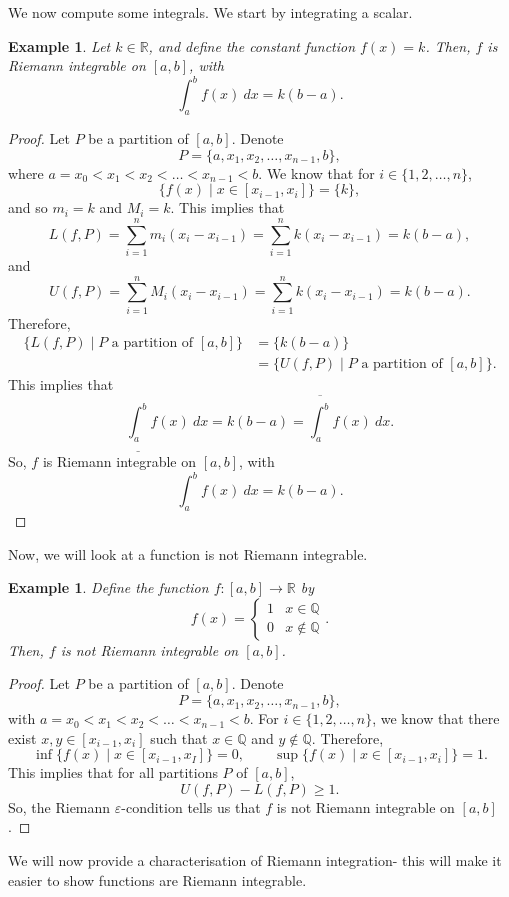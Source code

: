 \documentclass[a4paper, openany]{memoir}
\theoremstyle{definition}
\theoremstyle{plain}
\newtheorem{example}[definition]{Example}
\begin{document}
We now compute some integrals. We start by integrating a scalar.
\begin{example}
Let $k \in \mathbb{R}$, and define the constant function $f(x) = k$. Then, $f$ is Riemann integrable on $[a, b]$, with
\[\int_a^b f(x) \ dx = k(b - a).\]
\end{example}
\begin{proof}
Let $P$ be a partition of $[a, b]$. Denote
\[P = \{a, x_1, x_2, \dots, x_{n-1}, b\},\]
where $a = x_0 < x_1 < x_2 < \dots < x_{n-1} < b$. We know that for $i \in \{1, 2, \dots, n\}$,
\[\{f(x) \mid x \in [x_{i-1}, x_i]\} = \{k\},\]
and so $m_i = k$ and $M_i = k$. This implies that
\[L(f, P) = \sum_{i=1}^n m_i(x_i - x_{i-1}) = \sum_{i=1}^n k(x_i - x_{i-1}) = k(b - a),\]
and
\[U(f, P) = \sum_{i=1}^n M_i(x_i - x_{i-1}) = \sum_{i=1}^n k(x_i - x_{i-1}) = k(b - a).\]
Therefore,
\begin{align*}
    \{L(f, P) \mid P \text{ a partition of } [a, b]\} &= \{k(b - a)\} \\
    &= \{U(f, P) \mid P \text{ a partition of } [a, b]\}.
\end{align*}
This implies that
\[\underline{\int_a^b} f(x) \ dx = k(b - a) = \overline{\int_a^b} f(x) \ dx.\]
So, $f$ is Riemann integrable on $[a, b]$, with
\[\int_a^b f(x) \ dx = k(b - a).\]
\end{proof}
\noindent Now, we will look at a function is not Riemann integrable.
\begin{example}
Define the function $f: [a, b] \to \mathbb{R}$ by
\[f(x) = \begin{cases}
1 & x \in \mathbb{Q} \\
0 & x \not\in \mathbb{Q}
\end{cases}.\]
Then, $f$ is not Riemann integrable on $[a, b]$.
\end{example}
\begin{proof}
Let $P$ be a partition of $[a, b]$. Denote
\[P = \{a, x_1, x_2, \dots, x_{n-1}, b\},\]
with $a = x_0 < x_1 < x_2 < \dots < x_{n-1} < b$. For $i \in \{1, 2, \dots, n\}$, we know that there exist $x, y \in [x_{i-1}, x_i]$ such that $x \in \mathbb{Q}$ and $y \not\in \mathbb{Q}$. Therefore, 
\[\inf \{f(x) \mid x \in [x_{i-1}, x_I]\} = 0, \qquad \sup \{f(x) \mid x \in [x_{i-1}, x_i]\} = 1.\]
This implies that for all partitions $P$ of $[a, b]$,
\[U(f, P) - L(f, P) \geqslant 1.\]
So, the Riemann $\varepsilon$-condition tells us that $f$ is not Riemann integrable on $[a, b]$.
\end{proof}
\noindent We will now provide a characterisation of Riemann integration- this will make it easier to show functions are Riemann integrable.
\end{document}
